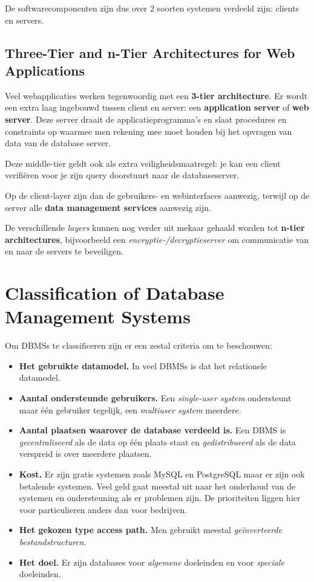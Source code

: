De softwarecomponenten zijn dus over 2 soorten systemen verdeeld zijn: clients en servers.

\subsection{Three-Tier and n-Tier Architectures for Web Applications}
Veel webapplicaties werken tegenwoordig met een \textbf{3-tier architecture}. Er wordt een extra laag ingebouwd tussen client en server: een \textbf{application server} of \textbf{web server}. Deze server draait de applicatieprogramma's en slaat procedures en constraints op waarmee men rekening mee moet houden bij het opvragen van data van de database server.

Deze middle-tier geldt ook als extra veiligheidsmaatregel: je kan een client verifi\"eren voor je zijn query doorstuurt naar de databaseserver.

Op de client-layer zijn dan de gebruikers- en webinterfaces aanwezig, terwijl op de server alle \textbf{data management services} aanwezig zijn.

De verschillende \textit{layers} kunnen nog verder uit mekaar gehaald worden tot \textbf{n-tier architectures}, bijvoorbeeld een \textit{encryptie-/decryptieserver} om communicatie van en naar de servers te beveiligen.

\section{Classification of Database Management Systems}
Om DBMSs te classificeren zijn er een zestal criteria om te beschouwen:
\begin{itemize}
\item\textbf{Het gebruikte datamodel.} In veel DBMSs is dat het relationele datamodel.
\item\textbf{Aantal ondersteunde gebruikers.} Een \textit{single-user system} ondersteunt maar \'e\'en gebruiker tegelijk, een \textit{multiuser system} meerdere.
\item\textbf{Aantal plaatsen waarover de database verdeeld is.} Een DBMS is \textit{gecentraliseerd} als de data op \'e\'en plaats staat en \textit{gedistribueerd} als de data verspreid is over meerdere plaatsen. 
\item\textbf{Kost.} Er zijn gratis systemen zoals MySQL en PostgreSQL maar er zijn ook betalende systemen. Veel geld gaat meestal uit naar het onderhoud van de systemen en ondersteuning als er problemen zijn. De prioriteiten liggen hier voor particulieren anders dan voor bedrijven.
\item\textbf{Het gekozen type access path.} Men gebruikt meestal \textit{ge\"inverteerde bestandstructuren}.
\item\textbf{Het doel.} Er zijn databases voor \textit{algemene} doeleinden en voor \textit{speciale} doeleinden.
\end{itemize}